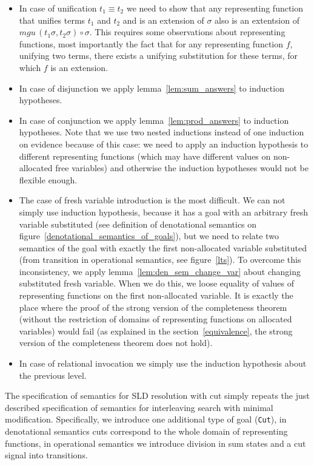 \begin{itemize}
\item In case of unification $t_1\equiv t_2$ we need to show that any representing function that unifies terms $t_1$ and $t_2$ and is an extension of $\sigma$ also is an extentsion of $mgu\,(t_1 \sigma, t_2 \sigma) \circ \sigma$. This requires some observations about representing functions, most importantly the fact that for any representing function $f$, unifying two terms, there exists a unifying substitution for these terms, for which $f$ is an extension.
\item In case of disjunction we apply lemma~\ref{lem:sum_answers} to induction hypotheses.
\item In case of conjunction we apply lemma~\ref{lem:prod_answers} to induction hypotheses. Note that we use two nested inductions instead of one induction on evidence because of this case: we need to apply an induction hypothesis to different representing functions (which may have different values on non-allocated free variables) and otherwise the induction hypotheses would not be flexible enough.
\item The case of fresh variable introduction is the most difficult. We can not simply use induction hypothesis, because it has a goal with an arbitrary fresh variable substituted (see definition of denotational semantics on figure~\ref{denotational_semantics_of_goals}), but we need to relate two semantics of the goal with exactly the first non-allocated variable substituted (from transition in operational semantics, see figure~\ref{lts}). To overcome this inconsistency, we apply lemma~\ref{lem:den_sem_change_var} about changing substituted fresh variable. When we do this, we loose equality of values of representing functions on the first non-allocated variable. It is exactly the place where the proof of the strong version of the completeness theorem (without the restriction of domains of representing functions on allocated variables) would fail (as explained in the section~\ref{equivalence}, the strong version of the completeness theorem does not hold).
\item In case of relational invocation we simply use the induction hypothesis about the previous level.
\end{itemize}

The specification of semantics for SLD resolution with cut simply repeats the just described specification of semantics for interleaving search with minimal modification. Specifically, we introduce one additional type of goal (\lstinline|Cut|), in denotational semantics cuts correspond to the whole domain of representing functions, in operational semantics we introduce division in sum states and a cut signal into transitions. 

